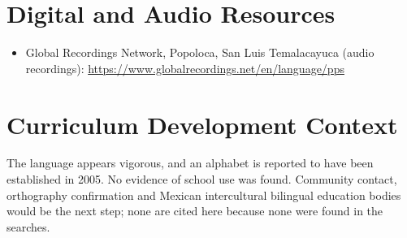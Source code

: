 \documentclass[12pt]{article}
\begin{document}
\section{Digital and Audio Resources}
\begin{itemize}
\item Global Recordings Network, Popoloca, San Luis Temalacayuca (audio recordings): \url{https://www.globalrecordings.net/en/language/pps}
\end{itemize}
\section{Curriculum Development Context}
The language appears vigorous, and an alphabet is reported to have been established in 2005. No evidence of school use was found. Community contact, orthography confirmation and Mexican intercultural bilingual education bodies would be the next step; none are cited here because none were found in the searches.
\end{document}
